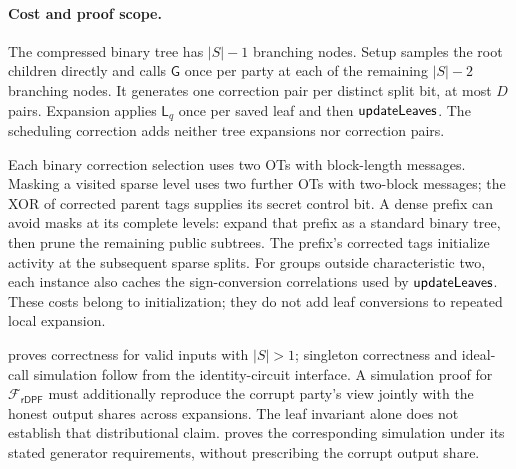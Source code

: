 \paragraph{Cost and proof scope.}
The compressed binary tree has $|S|-1$ branching nodes.
Setup samples the root children directly and calls $\mathsf G$ once per
party at each of the remaining $|S|-2$ branching nodes.
It generates one correction pair per distinct split bit, at most $D$ pairs.
Expansion applies $\mathsf L_q$ once per saved leaf and then
$\textsf{updateLeaves}$. The scheduling correction adds neither tree expansions nor
correction pairs.

Each binary correction selection uses two OTs with block-length messages.
Masking a visited sparse level uses two further OTs with two-block messages;
the XOR of corrected parent tags supplies its secret control bit.
A dense prefix can avoid masks at its complete levels: expand that prefix
as a standard binary tree, then prune the remaining public subtrees.
The prefix's corrected tags initialize activity at the subsequent sparse
splits. For groups outside characteristic two, each instance also caches
the sign-conversion correlations used by $\textsf{updateLeaves}$.
These costs belong to initialization; they do not add leaf conversions to
repeated local expansion.

 proves correctness for valid
inputs with $|S|>1$; singleton correctness and ideal-call simulation follow
from the identity-circuit interface. A simulation proof for
$\mathcal F_{\mathsf{rDPF}}$ must additionally reproduce the corrupt party's
view jointly with the honest output shares across expansions.
The leaf invariant alone does not establish that distributional claim.
 proves the corresponding simulation
under its stated generator requirements, without prescribing the corrupt
output share.
